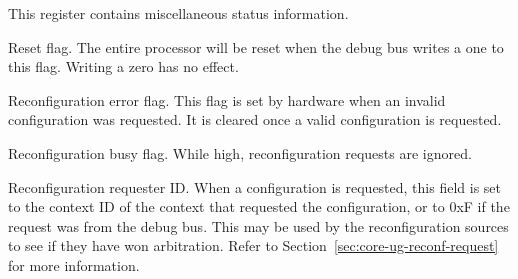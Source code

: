 

This register contains miscellaneous status information.

Reset flag. The entire \rvex{} processor will be reset when the debug bus writes
a one to this flag. Writing a zero has no effect.

\implementation{}

Reconfiguration error flag. This flag is set by hardware when an invalid
configuration was requested. It is cleared once a valid configuration is
requested.

\implementation{}

Reconfiguration busy flag. While high, reconfiguration requests are ignored.

\implementation{}

Reconfiguration requester ID. When a configuration is requested, this field is
set to the context ID of the context that requested the configuration, or to
0xF if the request was from the debug bus. This may be used by the
reconfiguration sources to see if they have won arbitration. Refer to
Section~\ref{sec:core-ug-reconf-request} for more information.

\implementation{}


